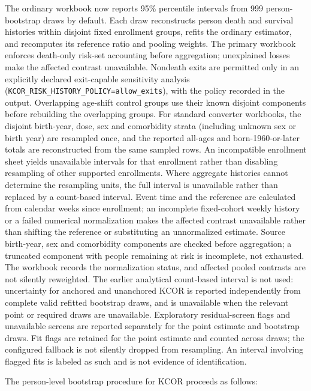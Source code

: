 \documentclass[
]{article}
\begin{document}
The ordinary workbook now reports 95\% percentile intervals from 999 person-bootstrap draws by default. Each draw reconstructs person death and survival histories within disjoint fixed enrollment groups, refits the ordinary estimator, and recomputes its reference ratio and pooling weights. The primary workbook enforces death-only risk-set accounting before aggregation; unexplained losses make the affected contrast unavailable. Nondeath exits are permitted only in an explicitly declared exit-capable sensitivity analysis (\texttt{KCOR\_RISK\_HISTORY\_POLICY=allow\_exits}), with the policy recorded in the output. Overlapping age-shift control groups use their known disjoint components before rebuilding the overlapping groups. For standard converter workbooks, the disjoint birth-year, dose, sex and comorbidity strata (including unknown sex or birth year) are resampled once, and the reported all-ages and born-1960-or-later totals are reconstructed from the same sampled rows. An incompatible enrollment sheet yields unavailable intervals for that enrollment rather than disabling resampling of other supported enrollments. Where aggregate histories cannot determine the resampling units, the full interval is unavailable rather than replaced by a count-based interval. Event time and the reference are calculated from calendar weeks since enrollment; an incomplete fixed-cohort weekly history or a failed numerical normalization makes the affected contrast unavailable rather than shifting the reference or substituting an unnormalized estimate. Source birth-year, sex and comorbidity components are checked before aggregation; a truncated component with people remaining at risk is incomplete, not exhausted. The workbook records the normalization status, and affected pooled contrasts are not silently reweighted. The earlier analytical count-based interval is not used: uncertainty for anchored and unanchored KCOR is reported independently from complete valid refitted bootstrap draws, and is unavailable when the relevant point or required draws are unavailable. Exploratory residual-screen flags and unavailable screens are reported separately for the point estimate and bootstrap draws. Fit flags are retained for the point estimate and counted across draws; the configured fallback is not silently dropped from resampling. An interval involving flagged fits is labeled as such and is not evidence of identification.

The person-level bootstrap procedure for KCOR proceeds as follows:
\end{document}
